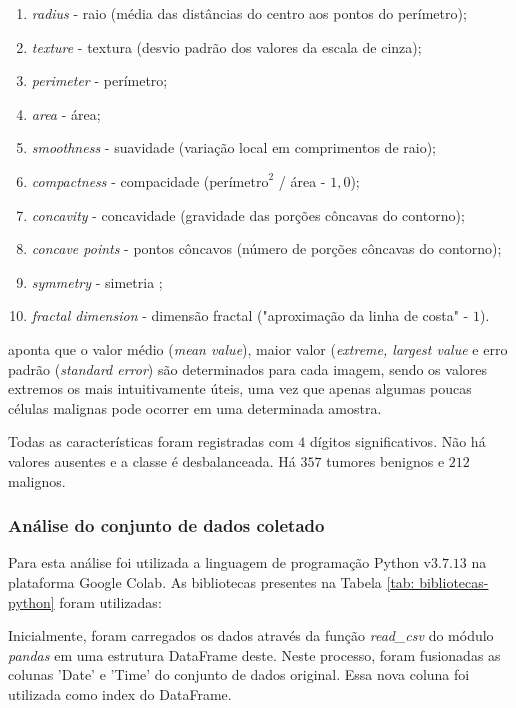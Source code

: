 \begin{enumerate}
    \item \textit{radius} - raio (média das distâncias do centro aos pontos do perímetro);
	\item \textit{texture} - textura (desvio padrão dos valores da escala de cinza);
	\item \textit{perimeter} - perímetro;
	\item \textit{area} - área;
	\item \textit{smoothness} - suavidade (variação local em comprimentos de raio);
	\item \textit{compactness} - compacidade ($\text{perímetro}^2$ / área - $1,0$);
	\item \textit{concavity} - concavidade (gravidade das porções côncavas do contorno);
	\item \textit{concave points} - pontos côncavos (número de porções côncavas do contorno);
	\item \textit{symmetry} - simetria ;
	\item \textit{fractal dimension} - dimensão fractal ("aproximação da linha de costa" - $1$).
\end{enumerate}

\cite{street_nuclear_1999} aponta que o valor médio (\textit{mean value}), maior valor (\textit{extreme, largest value} e erro padrão (\textit{standard error}) são determinados para cada imagem, sendo os valores extremos os mais intuitivamente úteis, uma vez que apenas algumas poucas células malignas pode ocorrer em uma determinada amostra.

Todas as características foram registradas com $4$ dígitos significativos. Não há valores ausentes e a classe é desbalanceada. Há $357$ tumores benignos e $212$ malignos.

\subsubsection{Análise do conjunto de dados coletado}

Para esta análise foi utilizada a linguagem de programação Python v$3.7.13$ na plataforma Google Colab. As bibliotecas  presentes na Tabela \ref{tab: bibliotecas-python} foram utilizadas:



Inicialmente, foram carregados os dados através da função \textit{read\_csv} do módulo \textit{pandas} em uma estrutura DataFrame deste. Neste processo, foram fusionadas as colunas 'Date' e 'Time' do conjunto de dados original. Essa nova coluna foi utilizada como index do DataFrame.  

